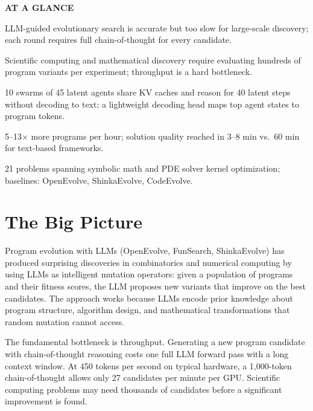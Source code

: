 \documentclass[10pt,twocolumn]{article}
\begin{document}
\begin{mdframed}[backgroundcolor=boxgray,linecolor=rulered,linewidth=1pt,
    innerleftmargin=6pt,innerrightmargin=6pt,
    innertopmargin=6pt,innerbottommargin=6pt]
\textbf{\small AT A GLANCE}\par\vspace{4pt}
\begin{description}[leftmargin=0pt,labelsep=4pt,itemsep=2pt,parsep=0pt,
    font=\small\bfseries]
  \item[Problem:] LLM-guided evolutionary search is accurate but
    too slow for large-scale discovery; each round requires full
    chain-of-thought for every candidate.
  \item[Why it matters:] Scientific computing and mathematical
    discovery require evaluating hundreds of program variants per
    experiment; throughput is a hard bottleneck.
  \item[Method:] 10 swarms of 45 latent agents share KV caches and
    reason for 40 latent steps without decoding to text; a lightweight
    decoding head maps top agent states to program tokens.
  \item[Result:] 5--13$\times$ more programs per hour; solution quality
    reached in 3--8 min vs.\ 60 min for text-based frameworks.
  \item[Evidence:] 21 problems spanning symbolic math and PDE solver
    kernel optimization; baselines: OpenEvolve, ShinkaEvolve, CodeEvolve.
\end{description}
\end{mdframed}

\section{The Big Picture}

Program evolution with LLMs (OpenEvolve, FunSearch, ShinkaEvolve) has
produced surprising discoveries in combinatorics and numerical computing
by using LLMs as intelligent mutation operators: given a population of
programs and their fitness scores, the LLM proposes new variants that
improve on the best candidates. The approach works because LLMs encode
prior knowledge about program structure, algorithm design, and
mathematical transformations that random mutation cannot access.

The fundamental bottleneck is throughput. Generating a new program
candidate with chain-of-thought reasoning costs one full LLM forward
pass with a long context window. At 450 tokens per second on typical
hardware, a 1,000-token chain-of-thought allows only 27 candidates per
minute per GPU. Scientific computing problems may need thousands of
candidates before a significant improvement is found.
\end{document}
